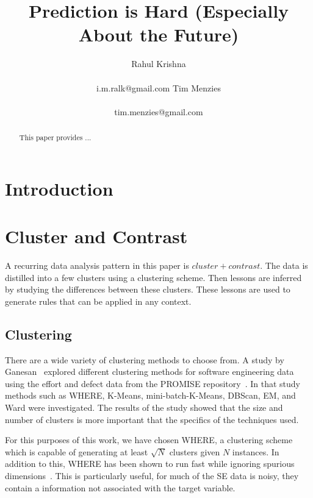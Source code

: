 \documentclass{sig-alternate}
\begin{document}
  

\title{Prediction is Hard (Especially About the Future)}
\author{
\alignauthor 
Rahul Krishna \\
       \\
       {i.m.ralk@gmail.com}
\alignauthor
Tim Menzies\\
       \\
       {tim.menzies@gmail.com}}
\setlength{\columnsep}{7mm}

\maketitle
\begin{abstract}
This paper provides ...  
\end{abstract}
\section{Introduction}
\section{Cluster and Contrast}
A recurring data analysis pattern in this paper is $cluster+contrast$. The data is distilled into a few clusters using a clustering scheme. Then lessons are inferred by studying the differences between these clusters. These lessons are used to generate rules that can be applied in any context.
\subsection{Clustering}
There are a wide variety of clustering methods to choose from. A study by Ganesan~\cite{div14} explored different clustering methods for software engineering data using the effort and defect data from the PROMISE repository~\cite{promise}. In that study methods such as WHERE, K-Means, mini-batch-K-Means, DBScan, EM, and Ward were investigated. The results of the study showed that the size and number of clusters is more important that the specifics of the techniques used. 

For this purposes of this work, we have chosen WHERE, a clustering scheme which is capable of generating at least $\sqrt{N}$ clusters given $N$ instances. In addition to this, WHERE has been shown to run fast while ignoring spurious dimensions~\cite{menzies2013}. This is particularly useful, for much of the SE data is noisy, they contain a information not associated with the target variable. 
\end{document}
